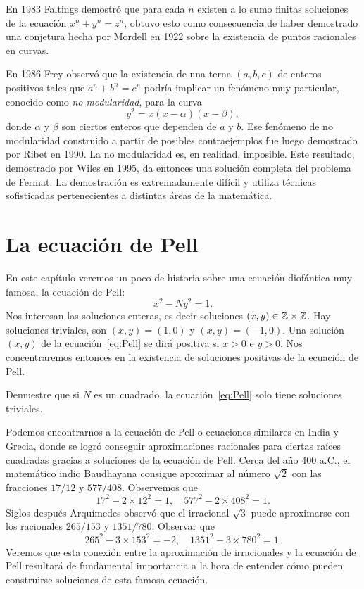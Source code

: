 En 1983 Faltings demostró que para cada $n$ existen a lo
sumo finitas soluciones de la ecuación $x^n+y^n=z^n$, obtuvo esto como
consecuencia de haber demostrado una conjetura hecha por Mordell en 1922 sobre
la existencia de puntos racionales en curvas. 

En 1986 Frey observó que la
existencia de una terna $(a,b,c)$ de enteros positivos tales que $a^n+b^n=c^n$
podría implicar un fenómeno muy particular, conocido como \emph{no
modularidad}, para la curva
\[
	y^2=x(x-\alpha)(x-\beta),
\]
donde $\alpha$ y $\beta$ son ciertos enteros que dependen de $a$ y $b$. 
Ese fenómeno de no modularidad construido a partir de posibles
contraejemplos fue luego demostrado por Ribet en 1990. La no modularidad es, en
realidad, imposible. Este resultado, demostrado por Wiles en 1995, da 
entonces una solución completa del problema de Fermat.
La demostración es extremadamente difícil y utiliza
técnicas sofisticadas pertenecientes a distintas áreas de la matemática.  

\section*{La ecuación de Pell}

En este capítulo veremos un poco de historia sobre una ecuación diofántica muy
famosa, la ecuación de Pell:
\begin{equation}
	\label{eq:Pell}
	x^2-Ny^2=1.
\end{equation}
Nos interesan las soluciones enteras, es decir soluciones $(x,y)\in\mathbb{Z}\times\mathbb{Z}$.
Hay soluciones triviales, son $(x,y)=(1,0)$ y $(x,y)=(-1,0)$. Una solución
$(x,y)$ de la ecuación~\eqref{eq:Pell} se dirá positiva si $x>0$ e $y>0$. Nos
concentraremos entonces en la existencia de soluciones positivas de la ecuación
de Pell.

\begin{exercise}
	Demuestre que si $N$ es un cuadrado, la ecuación~\eqref{eq:Pell} solo
	tiene soluciones triviales.
\end{exercise}

Podemos encontrarnos a la ecuación de Pell o ecuaciones similares en India y
Grecia, donde se logró conseguir aproximaciones racionales para ciertas raíces
cuadradas gracias a soluciones de la ecuación de Pell. 
Cerca del año 400 a.C., el matemático
indio Baudh\=ayana consigue aproximar al número $\sqrt{2}$ con las fracciones
$17/12$ y $577/408$. Observemos que 
\[
	17^2-2\times 12^2=1,\quad
	577^2-2\times 408^2=1.
\]
Siglos después Arquímedes observó que el irracional $\sqrt{3}$ puede
aproximarse con los racionales $265/153$ y $1351/780$. Observar que
\[
	265^2-3\times 153^2=-2,\quad
	1351^2-3\times 780^2=1. 
\]
Veremos que esta
conexión entre la aproximación de irracionales y la ecuación de Pell resultará
de fundamental importancia a la hora de entender cómo pueden construirse
soluciones de esta famosa ecuación.  
	
